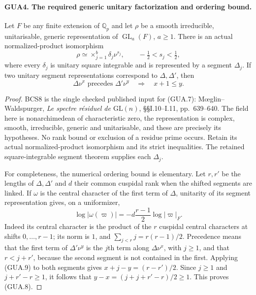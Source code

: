 \paragraph{GUA4. The required generic unitary factorization and ordering bound.}
\label{claim:GUA4}
Let $F$ be any finite extension of $\mathbb Q_p$ and let
$\rho$ be a smooth irreducible, unitarisable, generic
representation of $\operatorname{GL}_a(F)$, $a\geq1$.
There is an actual normalized-product isomorphism
\[
       \rho\simeq\mathop{\times}_{j=1}^b\delta_j\nu^{s_j},
       \qquad -\tfrac12<s_j<\tfrac12,                 \tag{GUA.7}
\]
where every $\delta_j$ is unitary square integrable and is
represented by a segment $\Delta_j$.  If two unitary
segment representations correspond to $\Delta,\Delta'$,
then
\[
            \Delta\nu^x\text{ precedes }\Delta'\nu^y
                       \quad\Longrightarrow\quad x+1\leq y.
                                                        \tag{GUA.8}
\]
\begin{proof}
BCS8 is the single checked published input for (GUA.7):
M\oe glin--Waldspurger, \emph{Le spectre r\'esiduel de
$\mathrm{GL}(n)$}, \S\S I.10--I.11, pp.~639--640.
The field here is nonarchimedean of characteristic zero,
the representation is complex, smooth, irreducible,
generic and unitarisable, and these are precisely its
hypotheses.  No rank bound or exclusion of a residue
prime occurs.  Retain its actual normalized-product
isomorphism and its strict inequalities.  The retained
square-integrable segment theorem supplies each $\Delta_j$.

For completeness, the numerical ordering bound is elementary.
Let $r,r'$ be the lengths of $\Delta,\Delta'$ and $d$ their
common cuspidal rank when the shifted segments are linked.
If $\omega$ is the central character of the first term of
$\Delta$, unitarity of its segment representation gives,
on a uniformizer,
\[
 \log|\omega(\varpi)|
          =-d\frac{r-1}{2}\log|\varpi|_F.            \tag{GUA.9}
\]
Indeed its central character is the product of the $r$
cuspidal central characters at shifts $0,\ldots,r-1$;
its norm is $1$, and $\sum_{j<r}j=r(r-1)/2$.
Precedence means that the first term of
$\Delta'\nu^y$ is the $j$th term along $\Delta\nu^x$,
with $j\geq1$, and that $r<j+r'$, because the second
segment is not contained in the first.  Applying (GUA.9)
to both segments gives
$x+j-y=(r-r')/2$.  Since $j\geq1$ and
$j+r'-r\geq1$, it follows that
$y-x=(j+j+r'-r)/2\geq1$.  This proves (GUA.8).
\end{proof}

